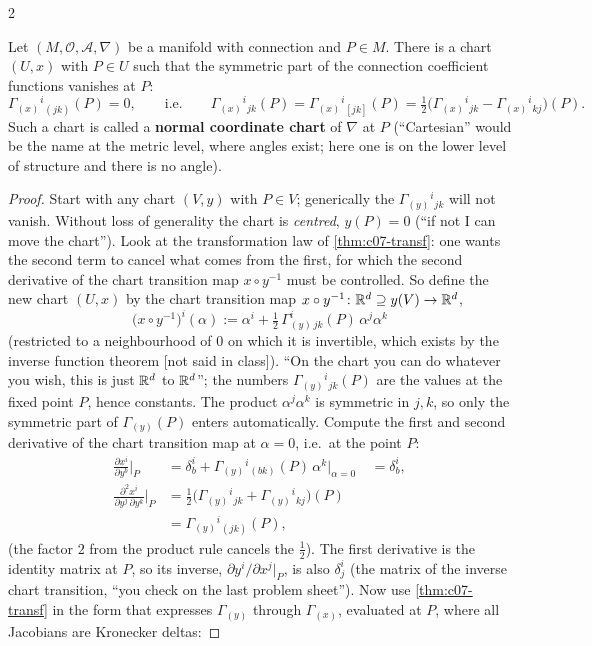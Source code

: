 \begin{paracol}{2}
\begin{theorem}\label{thm:c07-normal}
Let $(M,\mathcal O,\mathcal A,\nabla)$ be a manifold with connection and $P\in M$. There is a chart $(U,x)$ with $P\in U$ such that the symmetric part of the connection coefficient functions vanishes at $P$:
\[
  \Gamma_{(x)}{}^i{}_{(jk)}(P)=0,\qquad\text{i.e.}\qquad\Gamma_{(x)}{}^i{}_{jk}(P)=\Gamma_{(x)}{}^i{}_{[jk]}(P)=\tfrac12\bigl(\Gamma_{(x)}{}^i{}_{jk}-\Gamma_{(x)}{}^i{}_{kj}\bigr)(P).
\]
Such a chart is called a \textbf{normal coordinate chart} of $\nabla$ at $P$ (``Cartesian'' would be the name at the metric level, where angles exist; here one is on the lower level of structure and there is no angle).
\end{theorem}
\begin{proof}
Start with any chart $(V,y)$ with $P\in V$; generically the $\Gamma_{(y)}{}^i{}_{jk}$ will not vanish. Without loss of generality the chart is \emph{centred}, $y(P)=0$ (``if not I can move the chart''). Look at the transformation law of \cref{thm:c07-transf}: one wants the second term to cancel what comes from the first, for which the second derivative of the chart transition map $x\circ y^{-1}$ must be controlled. So define the new chart $(U,x)$ by the chart transition map $x\circ y^{-1}\colon\mathbb{R}^d\supseteq y(V)\to\mathbb{R}^d$,
\[
  \bigl(x\circ y^{-1}\bigr)^i(\alpha):=\alpha^i+\tfrac12\,\Gamma^i_{(y)\,jk}(P)\,\alpha^j\alpha^k
\]
(restricted to a neighbourhood of $0$ on which it is invertible, which exists by the inverse function theorem [not said in class]). ``On the chart you can do whatever you wish, this is just $\mathbb{R}^d$ to $\mathbb{R}^d$''; the numbers $\Gamma_{(y)}{}^i{}_{jk}(P)$ are the values at the fixed point $P$, hence constants. The product $\alpha^j\alpha^k$ is symmetric in $j,k$, so only the symmetric part of $\Gamma_{(y)}(P)$ enters automatically.
Compute the first and second derivative of the chart transition map at $\alpha=0$, i.e.\ at the point $P$:
\begin{align*}
  \frac{\partial x^i}{\partial y^b}\Big|_P&=\delta^i_b+\Gamma_{(y)}{}^i{}_{(bk)}(P)\,\alpha^k\big|_{\alpha=0}\ &=\delta^i_b,\\
  \frac{\partial^2x^i}{\partial y^j\,\partial y^k}\Big|_P&=\tfrac12\bigl(\Gamma_{(y)}{}^i{}_{jk}+\Gamma_{(y)}{}^i{}_{kj}\bigr)(P)\\ &=\Gamma_{(y)}{}^i{}_{(jk)}(P),
\end{align*}
(the factor $2$ from the product rule cancels the $\tfrac12$). The first derivative is the identity matrix at $P$, so its inverse, $\partial y^i/\partial x^j|_P$, is also $\delta^i_j$ (the matrix of the inverse chart transition, ``you check on the last problem sheet''). Now use \cref{thm:c07-transf} in the form that expresses $\Gamma_{(y)}$ through $\Gamma_{(x)}$, evaluated at $P$, where all Jacobians are Kronecker deltas:

\end{proof}
\end{paracol}
